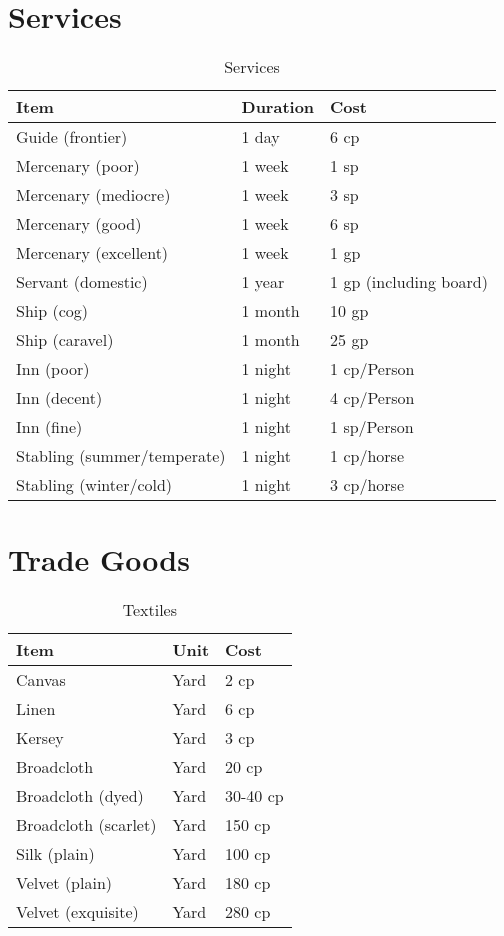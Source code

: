 \documentclass[oneside,11pt,english]{book}
\begin{document}
\section{Services}
\begin{table}[hb]
  \centering
  \caption{Services}
  \label{tab:Services}
  \begin{tabu} spread 0pt {*{3}{X[-1]}}
    Item &Duration &Cost\\\toprule
    Guide (frontier) &1 day &6 cp\\
    Mercenary (poor) &1 week &1 sp\\
    Mercenary (mediocre) &1 week &3 sp\\
    Mercenary (good) &1 week &6 sp\\
    Mercenary (excellent) &1 week &1 gp\\
    Servant (domestic) &1 year &1 gp (including board)\\
    Ship (cog) &1 month &10 gp\\
    Ship (caravel) &1 month &25 gp\\
    Inn (poor) &1 night &1 cp/Person\\
    Inn (decent) &1 night &4 cp/Person\\
    Inn (fine) &1 night &1 sp/Person\\
    Stabling (summer/temperate) &1 night &1 cp/horse\\
    Stabling (winter/cold) &1 night &3 cp/horse\\
  \end{tabu}
\end{table}


\section{Trade Goods}
\begin{table}[hb]
  \centering
  \caption{Textiles}
  \label{tab:Textiles}
  \begin{tabu} spread 0pt {*{3}{X[-1]}}
    Item &Unit &Cost\\\toprule
    Canvas &Yard &2 cp\\
    Linen &Yard &6 cp\\
    Kersey &Yard &3 cp\\
    Broadcloth &Yard &20 cp\\
    Broadcloth (dyed) &Yard &30-40 cp\\
    Broadcloth (scarlet) &Yard &150 cp\\
    Silk (plain) &Yard &100 cp\\
    Velvet (plain) &Yard &180 cp\\
    Velvet (exquisite) &Yard &280 cp\\
  \end{tabu}
\end{table}
\end{document}
